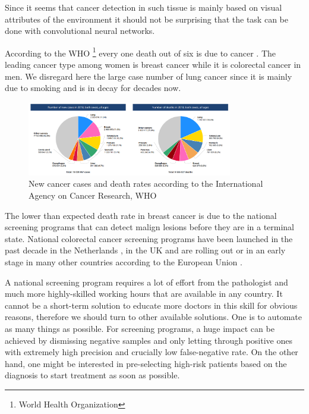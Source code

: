 \documentclass[a4paper,12pt]{article}
\begin{document}
\par Since it seems that cancer detection in such tissue is mainly based on visual attributes of the environment it should not be surprising that the task can be done with convolutional neural networks.

\vspace{4mm}

\par According to the WHO \footnote{World Health Organization} every one death out of six is due to cancer \cite{whoCANCER}. The leading cancer type among women is breast cancer while it is colorectal cancer in men. We disregard here the large case number of lung cancer since it is mainly due to smoking and is in decay for decades now.

\vspace{4mm}

\begin{figure}[H]
    \centering
    \includegraphics[width=0.8\textwidth]{all_cancer_pie_charts.png}
    \caption{New cancer cases and death rates according to the International Agency on Cancer Research,  WHO}
    \label{fig:cancer_pie_chart}
\end{figure}

\vspace{4mm}

\par The lower than expected death rate in breast cancer is due to the national screening programs that can detect malign lesions before they are in a terminal state. National colorectal cancer screening programs have been launched in the past decade in the Netherlands \cite{rivm_2014}, in the UK \cite{gov.uk_2015} and are rolling out or in an early stage in many other countries according to the European Union \cite{euReportOnCancer}.

\vspace{4mm}

\par A national screening program requires a lot of effort from the pathologist and much more highly-skilled working hours that are available in any country. It cannot be a short-term solution to educate more doctors in this skill for obvious reasons, therefore we should turn to other available solutions. One is to automate as many things as possible. For screening programs, a huge impact can be achieved by dismissing negative samples and only letting through positive ones with extremely high precision and crucially low false-negative rate. On the other hand, one might be interested in pre-selecting high-risk patients based on the diagnosis to start treatment as soon as possible.
\end{document}
